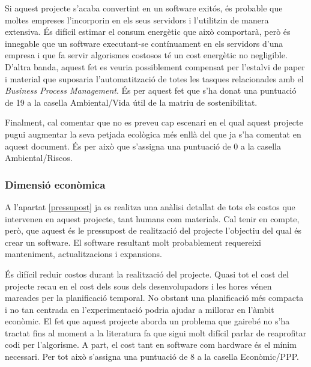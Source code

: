 Si aquest projecte s'acaba convertint en un software exitós, és probable que moltes empreses l'incorporin en els seus servidors i l'utilitzin de manera extensiva. És difícil estimar el consum energètic que això comportarà, però és innegable que un software executant-se contínuament en els servidors d'una empresa i que fa servir algorismes costosos té un cost energètic no negligible. D'altra banda, aquest fet es veuria possiblement compensat per l'estalvi de paper i material que suposaria l'automatització de totes les tasques relacionades amb el \emph{Business Process Management}. És per aquest fet que s'ha donat una puntuació de 19 a la casella Ambiental/Vida útil de la matriu de sostenibilitat. 

Finalment, cal comentar que no es preveu cap escenari en el qual aquest projecte pugui augmentar la seva petjada ecològica més enllà del que ja s'ha comentat en aquest document. És per això que s'assigna una puntuació de 0 a la casella Ambiental/Riscos.


\subsubsection{Dimensió econòmica}
\label{economica}

A l'apartat \ref{pressupost} ja es realitza una anàlisi detallat de tots els costos que intervenen en aquest projecte, tant humans com materials. Cal tenir en compte, però, que aquest és le pressupost de realització del projecte l'objectiu del qual és crear un software. El software resultant molt probablement requereixi manteniment, actualitzacions i expansions. 

És difícil reduir costos durant la realització del projecte. Quasi tot el cost del projecte recau en el cost dels sous dels desenvolupadors i les hores vénen marcades per la planificació temporal. No obstant una planificació més compacta i no tan centrada en l'experimentació podria ajudar a millorar en l'àmbit econòmic. El fet que aquest projecte aborda un problema que gairebé no s'ha tractat fins al moment a la literatura fa que sigui molt difícil parlar de reaprofitar codi per l'algorisme. A part, el cost tant en software com hardware és el mínim necessari. Per tot això s'assigna una puntuació de 8 a la casella Econòmic/PPP.

